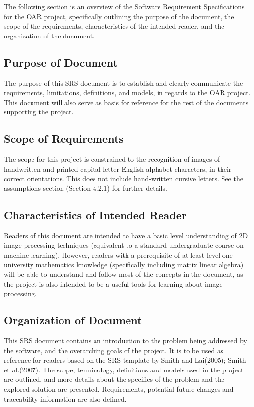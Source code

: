 \documentclass[12pt]{article}
\begin{document}
The following section is an overview of the Software Requirement Specifications for the OAR project, specifically outlining the 
purpose of the document, the scope of the requirements, characteristics of the intended reader, and the organization of the 
document.

\subsection{Purpose of Document}

The purpose of this SRS document is to establish and clearly communicate the requirements, limitations, definitions, and models, 
in regards to the OAR project. This document will also serve as basis for reference for the rest of the documents 
supporting the project. 

\subsection{Scope of Requirements} 

The scope for this project is constrained to the recognition of images of handwritten and printed capital-letter English
alphabet characters, in their correct orientations. This does not include hand-written cursive letters.
See the assumptions section (Section 4.2.1) for further details.

\subsection{Characteristics of Intended Reader} \label{sec_IntendedReader}

Readers of this document are intended to have a basic level understanding of 2D image 
processing techniques (equivalent to a standard undergraduate course on machine learning). However, readers with
a prerequisite of at least level one university mathematics knowledge (specifically including matrix linear algebra) will
be able to understand and follow most of the concepts in the document, as the project is also intended to be a useful tools
for learning about image processing.

\subsection{Organization of Document}

  This SRS document contains an introduction to the problem being addressed by the software,
  and the overarching goals of the project. It is to be used as reference for readers based on the
  SRS template by Smith and Lai(2005); Smith et al.(2007). The scope, terminology, definitions
  and models used in the project are outlined, and more details about the specifics of the problem and the explored
  solution are presented. Requirements, potential future changes and traceability information are also defined.
\end{document}
